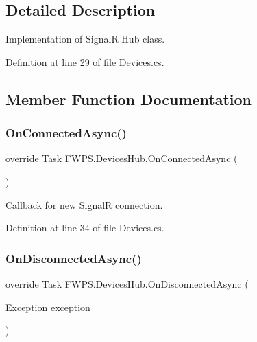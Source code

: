 \subsection{Detailed Description}
Implementation of SignalR Hub class. 

Definition at line 29 of file Devices.\+cs.



\subsection{Member Function Documentation}
\mbox{\label{class_f_w_p_s_1_1_devices_hub_aca0b77bc4434e8b29985876931c96c16}} 
\subsubsection{\texorpdfstring{On\+Connected\+Async()}{OnConnectedAsync()}}
{\footnotesize\ttfamily override Task F\+W\+P\+S.\+Devices\+Hub.\+On\+Connected\+Async (\begin{DoxyParamCaption}{ }\end{DoxyParamCaption})}



Callback for new SignalR connection. 



Definition at line 34 of file Devices.\+cs.

\mbox{\label{class_f_w_p_s_1_1_devices_hub_a75c74048ac8d2eccb161ee770bd04aeb}} 
\subsubsection{\texorpdfstring{On\+Disconnected\+Async()}{OnDisconnectedAsync()}}
{\footnotesize\ttfamily override Task F\+W\+P\+S.\+Devices\+Hub.\+On\+Disconnected\+Async (\begin{DoxyParamCaption}\item[{Exception}]{exception }\end{DoxyParamCaption})}



